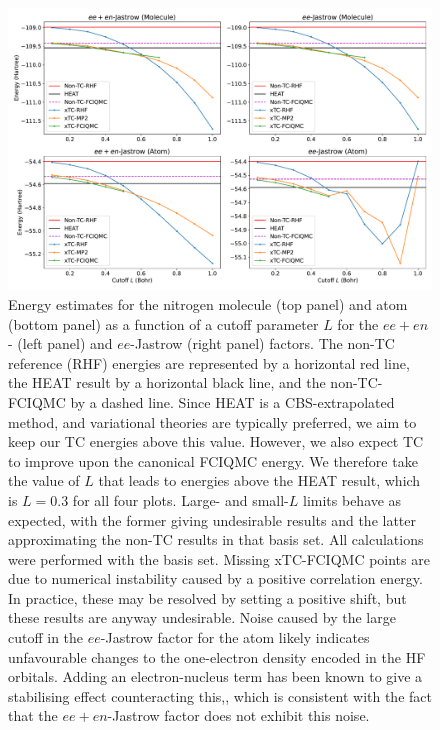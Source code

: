 \begin{figure}[h!]
    \centering
    \includegraphics[width=\textwidth]{figures/universal/cutoffs_combined}
    \caption{Energy estimates for the nitrogen molecule (top panel) and atom (bottom panel) as a function of a cutoff parameter $L$ for the $ee+en$- (left panel) and $ee$-Jastrow (right panel) factors. The non-TC reference (RHF) energies are represented by a horizontal red line, the HEAT result by a horizontal black line, and the non-TC-FCIQMC by a dashed line.
    Since HEAT is a \gls{CBS}-extrapolated method, and variational theories are typically preferred, we aim to keep our TC energies above this value. However, we also expect TC to improve upon the canonical FCIQMC energy.
    We therefore take the value of $L$ that leads to energies above the HEAT result, which is $L=0.3$ for all four plots. Large- and small-$L$ limits behave as expected, with the former giving undesirable results and the latter approximating the non-TC results in that basis set. All calculations were performed with the \avtz basis set. Missing xTC-FCIQMC points are due to numerical instability caused by a positive correlation energy. In practice, these may be resolved by setting a positive shift, but these results are anyway undesirable. Noise caused by the large cutoff in the $ee$-Jastrow factor for the atom likely indicates unfavourable changes to the one-electron density encoded in the HF orbitals. Adding an electron-nucleus term has been known to give a stabilising effect counteracting this,\supercite{needsVariational2020,boysCalculation1969}, which is consistent with the fact that the $ee+en$-Jastrow factor does not exhibit this noise.}
    \label{fig:fournais-cutoff-n2}
\end{figure}

